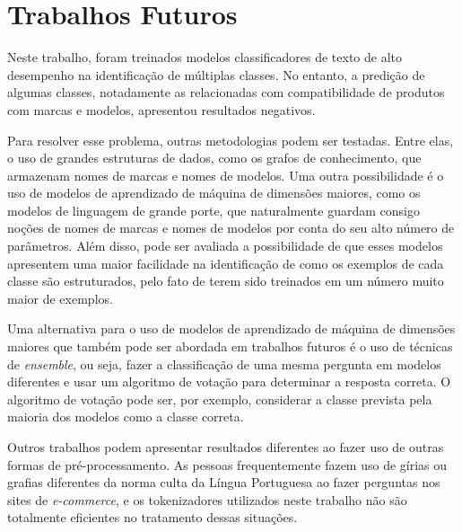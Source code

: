 \section{Trabalhos Futuros}
Neste trabalho, foram treinados modelos classificadores de texto de alto desempenho na identificação de múltiplas classes. No entanto, a predição de algumas classes, notadamente as relacionadas com compatibilidade de produtos com marcas e modelos, apresentou resultados negativos.

Para resolver esse problema, outras metodologias podem ser testadas. Entre elas, o uso de grandes estruturas de dados, como os grafos de conhecimento, que armazenam nomes de marcas e nomes de modelos. Uma outra possibilidade é o uso de modelos de aprendizado de máquina de dimensões maiores, como os modelos de linguagem de grande porte, que naturalmente guardam consigo noções de nomes de marcas e nomes de modelos por conta do seu alto número de parâmetros. Além disso, pode ser avaliada a possibilidade de que esses modelos apresentem uma maior facilidade na identificação de como os exemplos de cada classe são estruturados, pelo fato de terem sido treinados em um número muito maior de exemplos.

Uma alternativa para o uso de modelos de aprendizado de máquina de dimensões maiores que também pode ser abordada em trabalhos futuros é o uso de técnicas de \textit{ensemble}, ou seja, fazer a classificação de uma mesma pergunta em modelos diferentes e usar um algoritmo de votação para determinar a resposta correta. O algoritmo de votação pode ser, por exemplo, considerar a classe prevista pela maioria dos modelos como a classe correta.

Outros trabalhos podem apresentar resultados diferentes ao fazer uso de outras formas de pré-processamento. As pessoas frequentemente fazem uso de gírias ou grafias diferentes da norma culta da Língua Portuguesa ao fazer perguntas nos sites de \textit{e-commerce}, e os tokenizadores utilizados neste trabalho não são totalmente eficientes no tratamento dessas situações.
